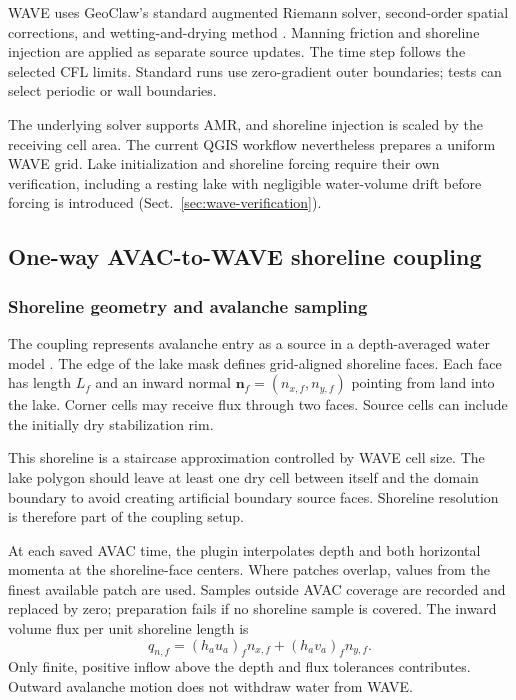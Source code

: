 \documentclass[11pt,a4paper]{article}
\begin{document}
WAVE uses GeoClaw's standard augmented Riemann solver, second-order spatial
corrections, and wetting-and-drying method
\citep{George2008,BergerEtAl2011}. Manning friction and shoreline injection
are applied as separate source updates. The time step follows the selected
CFL limits. Standard runs use zero-gradient outer boundaries; tests can
select periodic or wall boundaries.

The underlying solver supports AMR, and shoreline injection is scaled by
the receiving cell area. The current QGIS workflow nevertheless prepares a
uniform WAVE grid. Lake initialization and shoreline forcing require their
own verification, including a resting lake with negligible water-volume
drift before forcing is introduced (Sect.~\ref{sec:wave-verification}).

\subsection{One-way AVAC-to-WAVE shoreline coupling}
\label{sec:coupling-method}

\subsubsection{Shoreline geometry and avalanche sampling}

The coupling represents avalanche entry as a source in a depth-averaged
water model \citep{Vila1987,Ancey2023}. The edge of the lake mask defines
grid-aligned shoreline faces. Each face has length $L_f$ and an inward normal
$\boldsymbol{n}_f=(n_{x,f},n_{y,f})$ pointing from land into the lake.
Corner cells may receive flux through two faces. Source cells can include
the initially dry stabilization rim.

This shoreline is a staircase approximation controlled by WAVE cell size.
The lake polygon should leave at least one dry cell between itself and the
domain boundary to avoid creating artificial boundary source faces.
Shoreline resolution is therefore part of the coupling setup.

At each saved AVAC time, the plugin interpolates depth and both horizontal
momenta at the shoreline-face centers. Where patches overlap, values from
the finest available patch are used. Samples outside AVAC coverage are
recorded and replaced by zero; preparation fails if no shoreline sample is
covered. The inward volume flux per unit shoreline length is
\begin{equation}
  q_{n,f}=(h_au_a)_f n_{x,f}+(h_av_a)_f n_{y,f}.
  \label{eq:normal-flux}
\end{equation}
Only finite, positive inflow above the depth and flux tolerances contributes.
Outward avalanche motion does not withdraw water from WAVE.
\end{document}
